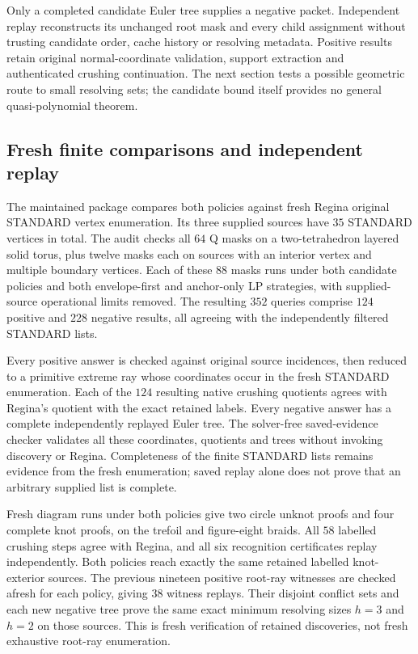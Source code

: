 Only a completed candidate Euler tree supplies a negative packet.
Independent replay reconstructs its unchanged root mask and every child
assignment without trusting candidate order, cache history or resolving
metadata.  Positive results retain original normal-coordinate validation,
support extraction and authenticated crushing continuation.  The next
section tests a possible geometric route to small resolving sets; the
candidate bound itself provides no general quasi-polynomial theorem.

\subsection{Fresh finite comparisons and independent replay}

The maintained package  compares
both policies against fresh Regina original STANDARD vertex enumeration.
Its three supplied sources have $35$ STANDARD vertices in total.  The
audit checks all $64$ Q masks on a two-tetrahedron layered solid torus,
plus twelve masks each on sources with an interior vertex and multiple
boundary vertices.  Each of these $88$ masks runs under both candidate
policies and both envelope-first and anchor-only LP strategies, with
supplied-source operational limits removed.  The resulting $352$
queries comprise $124$ positive and $228$ negative results, all agreeing
with the independently filtered STANDARD lists.

Every positive answer is checked against original source incidences,
then reduced to a primitive extreme ray whose coordinates occur in the
fresh STANDARD enumeration.  Each of the $124$ resulting native crushing
quotients agrees with Regina's quotient with the exact retained labels.
Every negative answer has a complete independently replayed Euler tree.
The solver-free saved-evidence checker validates all these coordinates,
quotients and trees without invoking discovery or Regina.  Completeness
of the finite STANDARD lists remains evidence from the fresh enumeration;
saved replay alone does not prove that an arbitrary supplied list is complete.

Fresh diagram runs under both policies give two circle unknot proofs and
four complete knot proofs, on the trefoil and figure-eight braids.
All $58$ labelled crushing steps agree with Regina, and all six recognition
certificates replay independently.  Both policies reach exactly the same
retained labelled knot-exterior sources.  The previous nineteen positive
root-ray witnesses are checked afresh for each policy, giving $38$ witness
replays.  Their disjoint conflict sets and each new negative tree prove
the same exact minimum resolving sizes $h=3$ and $h=2$ on those sources.
This is fresh verification of retained discoveries, not fresh exhaustive
root-ray enumeration.

